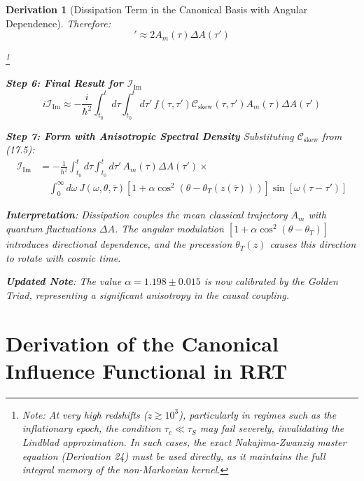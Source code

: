\documentclass[10pt, a4paper]{article}
\newtheorem{derivation}{Derivation}
\begin{document}
\begin{derivation}[Dissipation Term in the Canonical Basis with Angular Dependence]
Therefore:
\begin{equation}
[\cdots]' \approx 2A_m(\tau)\Delta A(\tau')
\tag{21.5}
\end{equation}

\footnote{Note: At very high redshifts ($z \gtrsim 10^3$), particularly in regimes such as the inflationary epoch, the condition $\tau_c \ll \tau_S$ may fail severely, invalidating the Lindblad approximation. In such cases, the exact Nakajima-Zwanzig master equation (Derivation 24) must be used directly, as it maintains the full integral memory of the non-Markovian kernel.}

\textbf{Step 6: Final Result for $\mathcal{I}_{\text{Im}}$}
\begin{equation}
i\mathcal{I}_{\text{Im}} \approx -\frac{i}{\hbar^2} \int_{t_0}^{t} d\tau \int_{t_0}^{t} d\tau' \, f(\tau,\tau') \mathcal{C}_{\text{skew}}(\tau,\tau') A_m(\tau) \Delta A(\tau')
\tag{21.6}
\end{equation}

\textbf{Step 7: Form with Anisotropic Spectral Density}
Substituting $\mathcal{C}_{\text{skew}}$ from (17.5):
\begin{align}
\mathcal{I}_{\text{Im}} &= -\frac{1}{\hbar^2} \int_{t_0}^{t} d\tau \int_{t_0}^{t} d\tau' \, A_m(\tau)\Delta A(\tau') \times \\
&\quad \int_0^\infty d\omega \, J(\omega,\theta,\bar{\tau}) [1 + \alpha \cos^2(\theta - \theta_T(z(\bar{\tau})))] \sin[\omega(\tau-\tau')]
\tag{21.7}
\end{align}

\textbf{Interpretation}: Dissipation couples the mean classical trajectory $A_m$ with quantum fluctuations $\Delta A$. The angular modulation $[1 + \alpha \cos^2(\theta - \theta_T)]$ introduces directional dependence, and the precession $\theta_T(z)$ causes this direction to rotate with cosmic time.

\textbf{Updated Note}: The value $\alpha = 1.198 \pm 0.015$ is now calibrated by the Golden Triad, representing a significant anisotropy in the causal coupling.
\end{derivation}

\section{Derivation of the Canonical Influence Functional in RRT}
\end{document}
